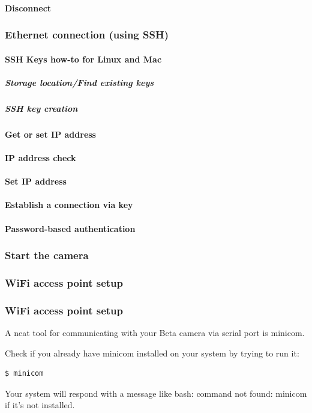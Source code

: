 \paragraph{Disconnect}
\subsubsection{Ethernet connection (using SSH)}
\paragraph{SSH Keys how-to for Linux and Mac}
\subparagraph{Storage location/Find existing keys}
\subparagraph{SSH key creation}
\paragraph{Get or set IP address}
\paragraph{IP address check}
\paragraph{Set IP address}
\paragraph{Establish a connection via key}
\paragraph{Password-based authentication}
\subsubsection{Start the camera}
\subsubsection{WiFi access point setup}

\subsubsection{WiFi access point setup}

\newcommand{\importantKeyword}[1]{\colorbox{keywordBack}{\textcolor{BrickRed}{#1}}}
A neat tool for communicating with your Beta camera via serial port is \importantKeyword{minicom}.

Check if you already have minicom installed on your system by trying to run it:

\begin{lstlisting}[language=bash,morekeywords=$,keywordstyle=\bfseries,frame=none,xleftmargin=.25in,belowskip=2em, aboveskip=2em]
$ minicom
\end{lstlisting}
Your system will respond with a message like bash: command not found: minicom if it's not installed.
